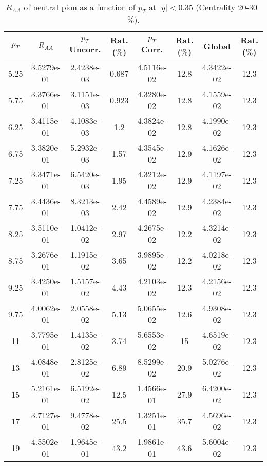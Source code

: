             
\begin{table}[!htb]
\centering
\begin{tabular}{|c|c|c|c|c|c|c|c|}
\hline
$p_{T}$ & $R_{AA}$ & $p_{T}$ Uncorr. & Rat. ($\%$) & $p_{T}$ Corr. & Rat. ($\%$) & Global & Rat. ($\%$)\\
\hline
5.25 & 3.5279e-01 & 2.4238e-03 & 0.687 & 4.5116e-02 & 12.8 & 4.3422e-02 & 12.3 \\ 
5.75 & 3.3766e-01 & 3.1151e-03 & 0.923 & 4.3280e-02 & 12.8 & 4.1559e-02 & 12.3 \\ 
6.25 & 3.4115e-01 & 4.1083e-03 & 1.2 & 4.3824e-02 & 12.8 & 4.1990e-02 & 12.3 \\ 
6.75 & 3.3820e-01 & 5.2932e-03 & 1.57 & 4.3545e-02 & 12.9 & 4.1626e-02 & 12.3 \\ 
7.25 & 3.3471e-01 & 6.5420e-03 & 1.95 & 4.3212e-02 & 12.9 & 4.1197e-02 & 12.3 \\ 
7.75 & 3.4436e-01 & 8.3213e-03 & 2.42 & 4.4589e-02 & 12.9 & 4.2384e-02 & 12.3 \\ 
8.25 & 3.5110e-01 & 1.0412e-02 & 2.97 & 4.2675e-02 & 12.2 & 4.3214e-02 & 12.3 \\ 
8.75 & 3.2676e-01 & 1.1915e-02 & 3.65 & 3.9895e-02 & 12.2 & 4.0218e-02 & 12.3 \\ 
9.25 & 3.4250e-01 & 1.5157e-02 & 4.43 & 4.2103e-02 & 12.3 & 4.2156e-02 & 12.3 \\ 
9.75 & 4.0062e-01 & 2.0558e-02 & 5.13 & 5.0655e-02 & 12.6 & 4.9308e-02 & 12.3 \\ 
11 & 3.7795e-01 & 1.4135e-02 & 3.74 & 5.6553e-02 & 15 & 4.6519e-02 & 12.3 \\ 
13 & 4.0848e-01 & 2.8125e-02 & 6.89 & 8.5299e-02 & 20.9 & 5.0276e-02 & 12.3 \\ 
15 & 5.2161e-01 & 6.5192e-02 & 12.5 & 1.4566e-01 & 27.9 & 6.4200e-02 & 12.3 \\ 
17 & 3.7127e-01 & 9.4778e-02 & 25.5 & 1.3251e-01 & 35.7 & 4.5696e-02 & 12.3 \\ 
19 & 4.5502e-01 & 1.9645e-01 & 43.2 & 1.9861e-01 & 43.6 & 5.6004e-02 & 12.3 \\ 
\hline
\end{tabular}
\caption{$R_{AA}$ of neutral pion as a function of $p_{T}$ at $|y|<0.35$ (Centrality 20-30~$\%$).}
\end{table}
            
